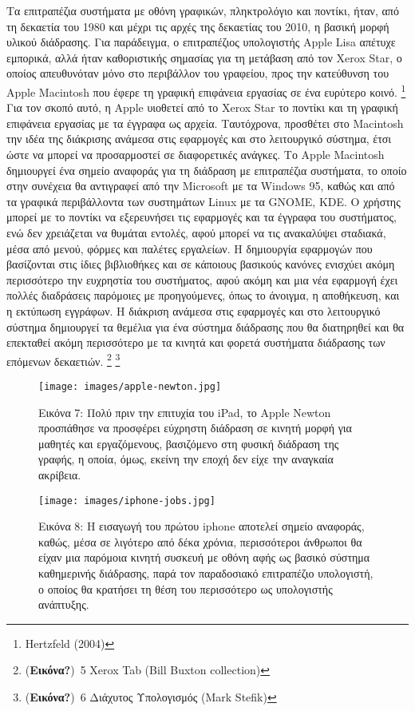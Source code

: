 \documentclass[
]{article}
\begin{document}
Τα επιτραπέζια συστήματα με οθόνη γραφικών, πληκτρολόγιο και ποντίκι,
ήταν, από τη δεκαετία του 1980 και μέχρι τις αρχές της δεκαετίας του
2010, η βασική μορφή υλικού διάδρασης. Για παράδειγμα, ο επιτραπέζιος
υπολογιστής Apple Lisa απέτυχε εμπορικά, αλλά ήταν καθοριστικής σημασίας
για τη μετάβαση από τον Xerox Star, ο οποίος απευθυνόταν μόνο στο
περιβάλλον του γραφείου, προς την κατεύθυνση του Apple Macintosh που
έφερε τη γραφική επιφάνεια εργασίας σε ένα ευρύτερο κοινό. \footnote{Hertzfeld
  (2004)} Για τον σκοπό αυτό, η Apple υιοθετεί από το Xerox Star το
ποντίκι και τη γραφική επιφάνεια εργασίας με τα έγγραφα ως αρχεία.
Ταυτόχρονα, προσθέτει στο Macintosh την ιδέα της διάκρισης ανάμεσα στις
εφαρμογές και στο λειτουργικό σύστημα, έτσι ώστε να μπορεί να
προσαρμοστεί σε διαφορετικές ανάγκες. Το Apple Macintosh δημιουργεί ένα
σημείο αναφοράς για τη διάδραση με επιτραπέζια συστήματα, το οποίο στην
συνέχεια θα αντιγραφεί από την Microsoft με τα Windows 95, καθώς και από
τα γραφικά περιβάλλοντα των συστημάτων Linux με τα GNOME, KDE. Ο χρήστης
μπορεί με το ποντίκι να εξερευνήσει τις εφαρμογές και τα έγγραφα του
συστήματος, ενώ δεν χρειάζεται να θυμάται εντολές, αφού μπορεί να τις
ανακαλύψει σταδιακά, μέσα από μενού, φόρμες και παλέτες εργαλείων. Η
δημιουργία εφαρμογών που βασίζονται στις ίδιες βιβλιοθήκες και σε
κάποιους βασικούς κανόνες ενισχύει ακόμη περισσότερο την ευχρηστία του
συστήματος, αφού ακόμη και μια νέα εφαρμογή έχει πολλές διαδράσεις
παρόμοιες με προηγούμενες, όπως το άνοιγμα, η αποθήκευση, και η εκτύπωση
εγγράφων. Η διάκριση ανάμεσα στις εφαρμογές και στο λειτουργικό σύστημα
δημιουργεί τα θεμέλια για ένα σύστημα διάδρασης που θα διατηρηθεί και θα
επεκταθεί ακόμη περισσότερο με τα κινητά και φορετά συστήματα διάδρασης
των επόμενων δεκαετιών. \footnote{(\textbf{Εικόνα?})~5 Xerox Tab (Bill
  Buxton collection)} \footnote{(\textbf{Εικόνα?})~6 Διάχυτος
  Υπολογισμός (Mark Stefik)}

\leavevmode{}%
\begin{figure}
\hypertarget{fig:apple-newton}{%
\centering
\texttt{[image: images/apple-newton.jpg]}
\caption{Εικόνα 7: Πολύ πριν την επιτυχία του iPad, το Apple Newton
προσπάθησε να προσφέρει εύχρηστη διάδραση σε κινητή μορφή για μαθητές
και εργαζόμενους, βασιζόμενο στη φυσική διάδραση της γραφής, η οποία,
όμως, εκείνη την εποχή δεν είχε την αναγκαία
ακρίβεια.}\label{fig:apple-newton}
}
\end{figure}

\leavevmode{}%
\begin{figure}
\hypertarget{fig:iphone-jobs}{%
\centering
\texttt{[image: images/iphone-jobs.jpg]}
\caption{Εικόνα 8: Η εισαγωγή του πρώτου iphone αποτελεί σημείο
αναφοράς, καθώς, μέσα σε λιγότερο από δέκα χρόνια, περισσότεροι άνθρωποι
θα είχαν μια παρόμοια κινητή συσκευή με οθόνη αφής ως βασικό σύστημα
καθημερινής διάδρασης, παρά τον παραδοσιακό επιτραπέζιο υπολογιστή, ο
οποίος θα κρατήσει τη θέση του περισσότερο ως υπολογιστής
ανάπτυξης.}\label{fig:iphone-jobs}
}
\end{figure}
\end{document}
